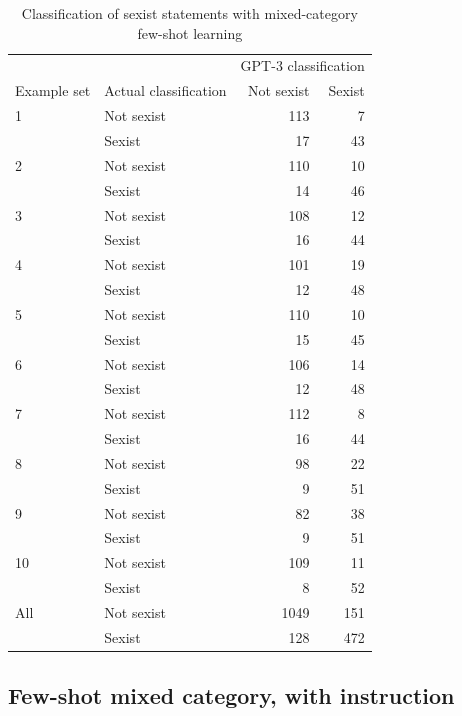 \documentclass[12pt,]{article}
\begin{document}
\begin{table}[!h]

\caption{\label{tab:fewshotmixed-sexism}Classification of sexist statements with mixed-category few-shot learning}
\centering
\fontsize{8}{10}\selectfont
\begin{tabular}[t]{llrr}
\toprule
\multicolumn{2}{c}{ } & \multicolumn{2}{c}{GPT-3 classification} \\
\cmidrule(l{3pt}r{3pt}){3-4}
Example set & Actual classification & Not sexist & Sexist\\
\midrule
1 & Not sexist & 113 & 7\\
 & Sexist & 17 & 43\\
\midrule
2 & Not sexist & 110 & 10\\
 & Sexist & 14 & 46\\
\midrule
3 & Not sexist & 108 & 12\\
 & Sexist & 16 & \vphantom{1} 44\\
\midrule
4 & Not sexist & 101 & 19\\
 & Sexist & 12 & \vphantom{1} 48\\
\midrule
5 & Not sexist & 110 & 10\\
 & Sexist & 15 & 45\\
\midrule
6 & Not sexist & 106 & 14\\
 & Sexist & 12 & 48\\
\midrule
7 & Not sexist & 112 & 8\\
 & Sexist & 16 & 44\\
\midrule
8 & Not sexist & 98 & 22\\
 & Sexist & 9 & \vphantom{1} 51\\
\midrule
9 & Not sexist & 82 & 38\\
 & Sexist & 9 & 51\\
\midrule
10 & Not sexist & 109 & 11\\
 & Sexist & 8 & 52\\
\midrule
All & Not sexist & 1049 & 151\\
 & Sexist & 128 & 472\\
\bottomrule
\end{tabular}
\end{table}

\newpage

\hypertarget{appendxbmuxedubstryctub}{%
\subsection{Few-shot mixed category, with instruction}\label{appendxbmuxedubstryctub}}
\end{document}
